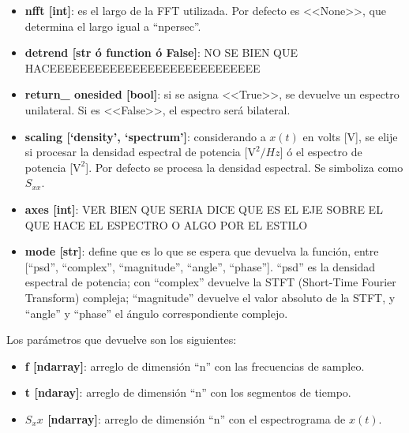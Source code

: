 \documentclass[assd_tp2_main.tex]{subfiles}
\begin{document}
\begin{itemize}
\item \textbf{nfft [int]}: es el largo de la FFT utilizada. Por defecto es <<None>>, que determina el largo igual a ``npersec''.

\item \textbf{detrend [str \'o function \'o False]}: NO SE BIEN QUE HACEEEEEEEEEEEEEEEEEEEEEEEEEEEE

\item \textbf{return\_ onesided [bool]}: si se asigna <<True>>, se devuelve un espectro unilateral. Si es <<False>>, el espectro ser\'a bilateral.

\item \textbf{scaling [‘density’, ‘spectrum’]}: considerando a $x(t)$ en volts [V], se elije si procesar la densidad espectral de potencia [$\textrm{V}^2/Hz$] \'o el espectro de potencia [$\textrm{V}^2$]. Por defecto se procesa la densidad espectral. Se simboliza como $S_{xx}$.

\item \textbf{axes [int]}: VER BIEN QUE SERIA DICE QUE ES EL EJE SOBRE EL QUE HACE EL ESPECTRO O ALGO POR EL ESTILO

\item \textbf{mode [str]}: define que es lo que se espera que devuelva la funci\'on, entre [``psd'', ``complex'', ``magnitude'', ``angle'', ``phase'']. ``psd'' es la densidad espectral de potencia; con ``complex'' devuelve la STFT (Short-Time Fourier Transform) compleja; ``magnitude'' devuelve el valor absoluto de la STFT, y ``angle'' y ``phase'' el \'angulo correspondiente complejo.

\end{itemize}

Los par\'ametros que devuelve son los siguientes:

\begin{itemize}

\item \textbf{f [ndarray]}: arreglo de dimensi\'on ``n'' con las frecuencias de sampleo.

\item \textbf{t [ndaray]}: arreglo de dimensi\'on ``n'' con los segmentos de tiempo.

\item \textbf{$S_xx$ [ndarray]}: arreglo de dimensi\'on ``n'' con el espectrograma de $x(t)$.

\end{itemize}
\end{document}
